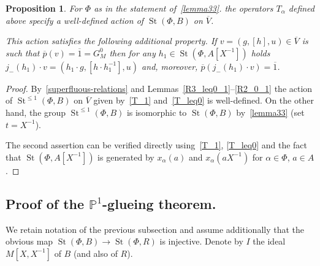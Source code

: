 \documentclass[oneside, 8pt]{amsart}
\newtheorem{prop}[lemma]{Proposition}
\theoremstyle{remark}
\theoremstyle{definition}
\numberwithin{lemma}{section}
\numberwithin{prop}{section}
\numberwithin{corollary}{section}
\DeclareMathOperator{\St}{St}
\newcommand{\inv}{^{-1}}
\numberwithin{equation}{section}
\begin{document}
\begin{prop} 
For $\Phi$ as in the statement of~\cref{lemma33}.
the operators $T_\alpha$ defined above specify a well-defined action of $\St(\Phi, B)$ on $\overline{V}$. 

This action satisfies the following additional property. If $v = (g, [h], u) \in \overline{V}$ is such that $\overline{p}(v) = \overline{1} = G_M^0$ then for any $h_1 \in \St(\Phi, A[X\inv])$ holds $j_-(h_1) \cdot v = (h_1 \cdot g, [h \cdot h_1^{-1}], u)$ and, moreover, $\overline{p}(j_-(h_1) \cdot v) = \overline{1}$.
\end{prop}
\begin{proof}
  By~\cref{superfluous-relations} and Lemmas~\ref{R3_leq0_1}--\ref{R2_0_1} the action of $\St^{\leq 1}(\Phi, B)$ on $\overline{V}$ given by~\eqref{T_1} and~\eqref{T_leq0} is well-defined. On the other hand, the group $\St^{\leq 1}(\Phi, B)$ is isomorphic to $\St(\Phi, B)$ by~\cref{lemma33} (set $t = X^{-1}$).
  
  The second assertion can be verified directly using~\eqref{T_1}, \eqref{T_leq0} and the fact that $\St(\Phi, A[X\inv])$ is generated by $x_\alpha(a)$ and $x_\alpha(aX\inv)$ for $\alpha\in\Phi$, $a\in A$.
\end{proof}

\subsection{Proof of the $\mathbb{P}^1$-glueing theorem.}
We retain notation of the previous subsection and assume additionally that
the obvious map $\St(\Phi, B) \to \St(\Phi, R)$ is injective.
Denote by $I$ the ideal $M[X, X\inv]$ of $B$ (and also of $R$).
\end{document}
